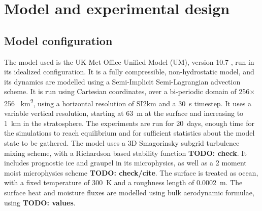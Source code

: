 \documentclass[11pt,a4paper]{article}
\newcommand\todo[1]{\textbf{TODO: #1}}
\begin{document}
\section{Model and experimental design}

\subsection{Model configuration}


The model used is the UK Met Office Unified Model (UM), version 10.7 \parencite{todo}, run in its idealized configuration. It is a fully compressible, non-hydrostatic model, and its dynamics are modelled using a Semi-Implicit Semi-Lagrangian advection scheme. It is run using Cartesian coordinates, over a bi-periodic domain of 256$\times$256 \SI{}{km^2}, using a horizontal resolution of SI{2}{km} and a \SI{30}{s} timestep. It uses a variable vertical resolution, starting at \SI{63}{m} at the surface and increasing to \SI{1}{km} in the stratosphere. 
The experiments are run for \SI{20}{days}, enough time for the simulations to reach equilibrium and for sufficient statistics about the model state to be gathered. The model uses a 3D Smagorinsky subgrid turbulence mixing scheme, with a Richardson based stability function \todo{check}. It includes prognostic ice and graupel in its microphysics, as well as a 2 moment moist microphysics scheme \todo{check/cite}. The surface is treated as ocean, with a fixed temperature of \SI{300}{K} and a roughness length of \SI{0.0002}{m}. The surface heat and moisture fluxes are modelled using bulk aerodynamic formulae, using \todo{values}.
\end{document}
